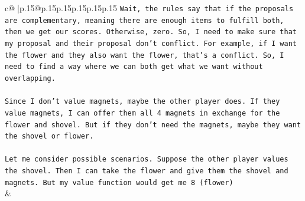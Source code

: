 \documentclass{article}
\begin{document}
{\begin{supertabular}{c@{$\;$}|p{.15\linewidth}@{}p{.15\linewidth}p{.15\linewidth}p{.15\linewidth}p{.15\linewidth}p{.15\linewidth}}
{{{\texttt{Wait, the rules say that if the proposals are complementary, meaning there are enough items to fulfill both, then we get our scores. Otherwise, zero. So, I need to make sure that my proposal and their proposal don't conflict. For example, if I want the flower and they also want the flower, that's a conflict. So, I need to find a way where we can both get what we want without overlapping.} \\
\\ 
\texttt{Since I don't value magnets, maybe the other player does. If they value magnets, I can offer them all 4 magnets in exchange for the flower and shovel. But if they don't need the magnets, maybe they want the shovel or flower. } \\
\\ 
\texttt{Let me consider possible scenarios. Suppose the other player values the shovel. Then I can take the flower and give them the shovel and magnets. But my value function would get me 8 (flower)} \\
            }
        }
    }
    & \\ \\


\end{supertabular}}
\end{document}
